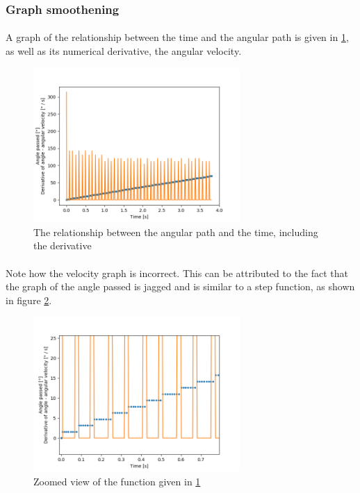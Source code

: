 \documentclass[a4paper]{article}
\begin{document}
\subsubsection{Graph smoothening}

\paragraph*{}
A graph of the relationship between the time and the angular path is given
in \ref{fig:ang-path-time}, as well as its numerical derivative, the angular
velocity.

\begin{figure}[ht]
  \centering
  \includegraphics[width=0.7\textwidth]{img/ang-path-time}
    \caption{The relationship between the angular path and the time, including
    the derivative}
  \label{fig:ang-path-time}
\end{figure}

\paragraph*{}
Note how the velocity graph is incorrect. This can be attributed to the fact
that the graph of the angle passed is jagged and is similar to a step function,
as shown in figure \ref{fig:ang-path-time-zoom}.

\begin{figure}[ht]
  \centering
  \includegraphics[width=0.7\textwidth]{img/ang-path-time-zoom}
  \caption{Zoomed view of the function given in \ref{fig:ang-path-time}}
  \label{fig:ang-path-time-zoom}
\end{figure}
\end{document}
